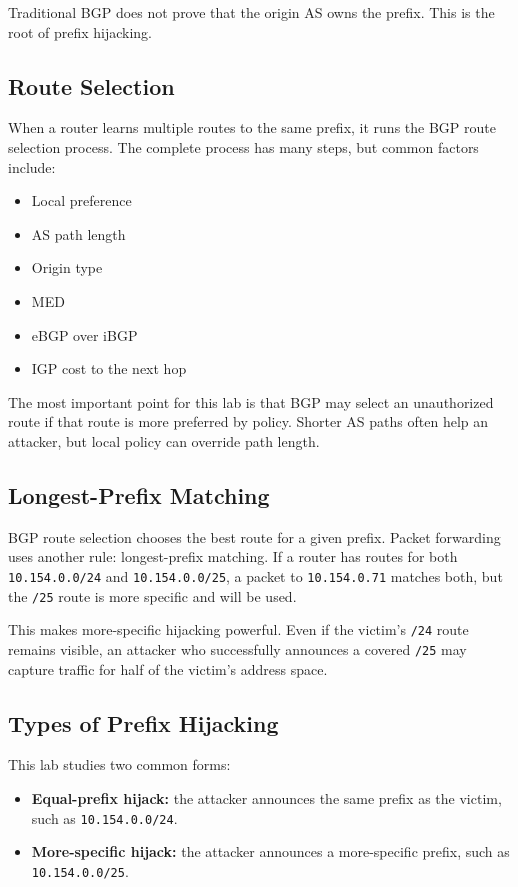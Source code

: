 Traditional BGP does not prove that the origin AS owns the prefix. This is the
root of prefix hijacking.

\subsection{Route Selection}

When a router learns multiple routes to the same prefix, it runs the BGP route
selection process. The complete process has many steps, but common factors
include:

\begin{itemize}[noitemsep]
\item Local preference
\item AS path length
\item Origin type
\item MED
\item eBGP over iBGP
\item IGP cost to the next hop
\end{itemize}

The most important point for this lab is that BGP may select an unauthorized
route if that route is more preferred by policy. Shorter AS paths often help an
attacker, but local policy can override path length.

\subsection{Longest-Prefix Matching}

BGP route selection chooses the best route for a given prefix. Packet forwarding
uses another rule: longest-prefix matching. If a router has routes for both
\texttt{10.154.0.0/24} and \texttt{10.154.0.0/25}, a packet to
\texttt{10.154.0.71} matches both, but the \texttt{/25} route is more specific
and will be used.

This makes more-specific hijacking powerful. Even if the victim's
\texttt{/24} route remains visible, an attacker who successfully announces a
covered \texttt{/25} may capture traffic for half of the victim's address
space.

\subsection{Types of Prefix Hijacking}

This lab studies two common forms:

\begin{itemize}[noitemsep]
\item \textbf{Equal-prefix hijack:} the attacker announces the same prefix as
      the victim, such as \texttt{10.154.0.0/24}.
\item \textbf{More-specific hijack:} the attacker announces a more-specific
      prefix, such as \texttt{10.154.0.0/25}.
\end{itemize}

